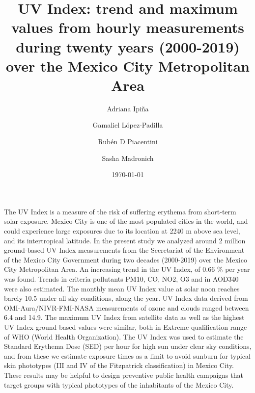 \documentclass[10pt]{article}
\renewenvironment{abstract}
  {{\bfseries\noindent{\abstractname}\par\nobreak}\footnotesize}
  {\bigskip}
\begin{document}
\title{UV Index: trend and maximum values from hourly measurements during
twenty years (2000-2019) over the Mexico City Metropolitan Area}


\author[1]{Adriana Ipiña }%
\author[2]{Gamaliel López-Padilla}%
\author[1]{Rubén D Piacentini}%
\author[3]{Sasha Madronich}
%
%


\vspace{-1em}



  \date{\today}


\begingroup
\let\center\flushleft
\let\endcenter\endflushleft
\maketitle
\endgroup





\begin{abstract}
The UV Index is a measure of the risk of suffering erythema from short-term solar exposure. 
Mexico City is one of the most populated cities in the world, and could experience large exposures due to its 
location at 2240 m above sea level, and its intertropical latitude. In the present study we analyzed around 2 million 
ground-based UV Index measurements from the Secretariat of the Environment of the Mexico City Government during two decades 
(2000-2019) over the Mexico City Metropolitan Area. An increasing trend in the UV Index, of 0.66 \% per 
year was found. Trends in criteria pollutants PM10, CO, NO2, O3 and in AOD340 were also estimated. The monthly mean UV 
Index value at solar noon reaches barely 10.5 under all sky conditions, along the year. UV Index data derived from 
OMI-Aura/NIVR-FMI-NASA measurements of ozone and clouds ranged between 6.4 and 14.9. The maximum UV Index from satellite data as 
well as the highest UV Index ground-based values were similar, both in Extreme qualification range of WHO (World Health Organization). 
The UV Index was used to estimate the Standard Erythema Dose (SED) per hour for high sun under clear sky conditions, and from these we 
estimate exposure times as a limit to avoid sunburn for typical skin phototypes (III and IV of the Fitzpatrick classification) in Mexico City. These results may be helpful to design preventive public health campaigns that target groups with typical phototypes of the inhabitants of the Mexico City.
\end{abstract}%
\end{document}

